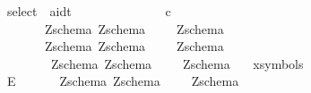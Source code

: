 \begin{isabellebody}
\ \ {\isachardoublequoteopen}{\isacharunderscore}select{\isachardoublequoteclose}\ {\isacharcolon}{\isacharcolon}\ {\isachardoublequoteopen}{\isacharbrackleft}{\isacharprime}a{\isacharcomma}idt{\isacharbrackright}\ \ \ \ \ \ \ \ \ \ \ \ \ \ {\isacharequal}{\isachargreater}\ {\isacharprime}c{\isachardoublequoteclose}\ \ \ \ \ \ {\isacharparenleft}{\isachardoublequoteopen}{\isacharunderscore}{\isachardot}{\isacharunderscore}{\isachardoublequoteclose}\ {\isacharbrackleft}{}{}{}{\isacharcomma}{}{}{}{\isacharbrackright}{}{}{}{\isacharparenright}\ \ \ \isanewline
\ \ {\isachardoublequoteopen}{\isacharbar}{\isacharbackslash}{\isachardoublequoteclose}\ \ \ \ \ {\isacharcolon}{\isacharcolon}\ {\isachardoublequoteopen}{\isacharbrackleft}Zschema{\isacharcomma}\ Zschema{\isacharbrackright}\ \ \ \ {\isacharequal}{\isachargreater}\ Zschema{\isachardoublequoteclose}\ {\isacharparenleft}\ {}{}{\isacharparenright}\isanewline
\ \ {\isachardoublequoteopen}{\isacharpercent}{\isacharpercent}{\isacharsemicolon}{\isachardoublequoteclose}\ \ \ \ \ {\isacharcolon}{\isacharcolon}\ {\isachardoublequoteopen}{\isacharbrackleft}Zschema{\isacharcomma}\ Zschema{\isacharbrackright}\ \ \ \ {\isacharequal}{\isachargreater}\ Zschema{\isachardoublequoteclose}\ {\isacharparenleft}\ {}{}{\isacharparenright}\isanewline
\ \ {\isachardoublequoteopen}{\isachargreater}{\isachargreater}{\isachardoublequoteclose}\ \ \ \ \ \ {\isacharcolon}{\isacharcolon}\ {\isachardoublequoteopen}{\isacharbrackleft}Zschema{\isacharcomma}\ Zschema{\isacharbrackright}\ \ \ \ {\isacharequal}{\isachargreater}\ Zschema{\isachardoublequoteclose}\ {\isacharparenleft}\ {}{}{\isacharparenright}\isanewline
\isanewline
\isanewline
{}\isamarkupfalse%
\ {\isacharparenleft}xsymbols{\isacharparenright}\isanewline
\ \ {\isachardoublequoteopen}{\isacharpercent}E{\isachardoublequoteclose}\ \ \ \ \ \ {\isacharcolon}{\isacharcolon}\ {\isachardoublequoteopen}{\isacharbrackleft}Zschema{\isacharcomma}\ Zschema{\isacharbrackright}\ \ \ \ {\isacharequal}{\isachargreater}\ Zschema{\isachardoublequoteclose}\ {\isacharparenleft}{\isachardoublequoteopen}{\isasymSexists}\ {\isacharparenleft}{}{\isacharunderscore}{\isacharparenright}\ {\isasymspot}\ {\isacharparenleft}{\isacharunderscore}{\isacharparenright}{\isachardoublequoteclose}\ \ \ \ {\isacharbrackleft}{}{}{\isacharcomma}{}{}{\isacharbrackright}{}{}{\isacharparenright}\isanewline

\end{isabellebody}
